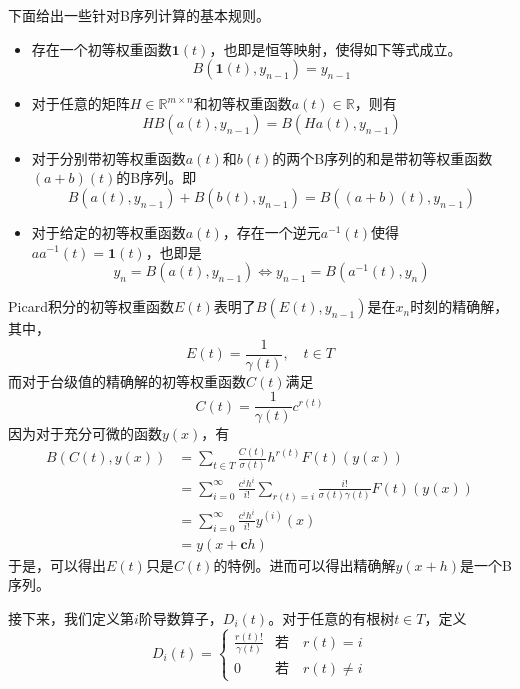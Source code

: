 下面给出一些针对B序列计算的基本规则。
\begin{itemize}
\item 存在一个初等权重函数$\bm{1}(t)$，也即是恒等映射，使得如下等式成立。
\begin{equation}
B(\bm{1}(t),y_{n-1})=y_{n-1}
\end{equation}
\item 对于任意的矩阵$H\in\mathbb{R}^{m\times n}$和初等权重函数$a(t)\in\mathbb{R}$，则有
\begin{equation}
HB(a(t),y_{n-1})=B(Ha(t),y_{n-1})
\end{equation}
\item 对于分别带初等权重函数$a(t)$和$b(t)$的两个B序列的和是带初等权重函数$(a+b)(t)$的B序列。即
\begin{equation}
B(a(t),y_{n-1})+B(b(t),y_{n-1})=B((a+b)(t),y_{n-1})
\end{equation}
\item 对于给定的初等权重函数$a(t)$，存在一个逆元$a^{-1}(t)$使得$aa^{-1}(t)=\bm{1}(t)$，也即是
\begin{equation}
y_n=B(a(t),y_{n-1})\Longleftrightarrow y_{n-1}=B(a^{-1}(t),y_n)
\end{equation}
\end{itemize}

Picard积分的初等权重函数$E(t)$表明了$B(E(t),y_{n-1})$是在$x_n$时刻的精确解，其中，
\begin{equation}
E(t)=\frac{1}{\gamma(t)},\quad t\in T
\end{equation}
而对于台级值的精确解的初等权重函数$C(t)$满足
\begin{equation}
C(t)=\frac{1}{\gamma(t)}c^{r(t)}
\end{equation}
因为对于充分可微的函数$y(x)$，有
\begin{equation}
\begin{aligned}
B(C(t),y(x))&=\sum_{t\in T}\frac{C(t)}{\sigma(t)}h^{r(t)}F(t)(y(x))\\
&=\sum_{i=0}^{\infty}\frac{c^ih^i}{i!}\sum_{r(t)=i}\frac{i!}{\sigma(t)\gamma(t)}F(t)(y(x))\\
&=\sum_{i=0}^{\infty}\frac{c^ih^i}{i!}y^{(i)}(x)\\
&=y(x+\bm{c}h)
\end{aligned}
\end{equation}
于是，可以得出$E(t)$只是$C(t)$的特例。进而可以得出精确解$y(x+h)$是一个B序列。

接下来，我们定义第$i$阶导数算子，$D_i(t)$。对于任意的有根树$t\in T$，定义
\begin{equation}
D_i(t)=\begin{cases}
\displaystyle\frac{r(t)!}{\gamma(t)} & \text{若}\quad r(t)=i\\
0& \text{若}\quad r(t)\neq i
\end{cases}
\end{equation}

